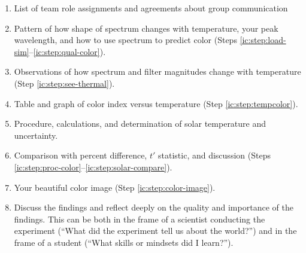 \begin{enumerate}

\item List of team role assignments and agreements about group communication

\item Pattern of how shape of spectrum changes with temperature, your peak
wavelength, and how to use spectrum to predict color (Steps
\ref{ic:step:load-sim}--\ref{ic:step:qual-color}).
	
\item Observations of how spectrum and filter magnitudes change with
temperature (Step \ref{ic:step:see-thermal}).
	
\item Table and graph of color index versus temperature (Step
\ref{ic:step:tempcolor}).
	
\item Procedure, calculations, and determination of solar temperature and
uncertainty.
	
\item Comparison with percent difference, $t'$ statistic, and discussion (Steps
\ref{ic:step:proc-color}--\ref{ic:step:solar-compare}).
	
\item Your beautiful color image (Step \ref{ic:step:color-image}).
	
\item Discuss the findings and reflect deeply on the quality and importance of
the findings. This can be both in the frame of a scientist conducting the
experiment (“What did the experiment tell us about the world?”) and in the
frame of a student (“What skills or mindsets did I learn?”).
	
%	

\end{enumerate}
